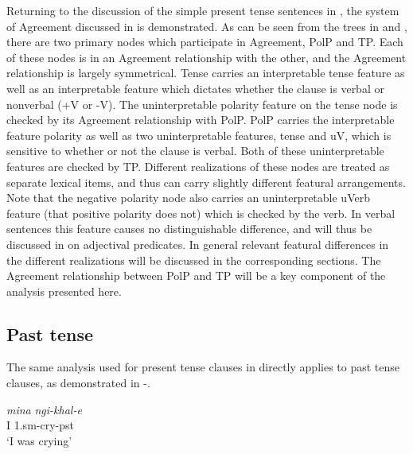 \documentclass[output=paper]{langsci/langscibook}
\begin{document}
{Returning to the discussion of the simple present tense sentences in , the system of Agreement discussed in  is demonstrated. As can be seen from the trees in  and , there are two primary nodes which participate in Agreement, PolP and TP. Each of these nodes is in an Agreement relationship with the other, and the Agreement relationship is largely symmetrical. Tense carries an interpretable tense feature as well as an interpretable feature which dictates whether the clause is verbal or nonverbal (+V or -V). The uninterpretable polarity feature on the tense node is checked by its Agreement relationship with PolP. PolP carries the interpretable feature polarity as well as two uninterpretable features, tense and uV, which is sensitive to whether or not the clause is verbal. Both of these uninterpretable features are checked by TP. Different realizations of these nodes are treated as separate lexical items, and thus can carry slightly different featural arrangements. Note that the negative polarity node also carries an uninterpretable uVerb feature (that positive polarity does not) which is checked by the verb. In verbal sentences this feature causes no distinguishable difference, and will thus be discussed in  on adjectival predicates. In general relevant featural differences in the different realizations will be discussed in the corresponding sections. The Agreement relationship between PolP and TP will be a key component of the analysis presented here.


\subsection{Past tense}

The same analysis used for present tense clauses in  directly applies to past tense clauses, as demonstrated in -.



\begin{exe}
\ex \begin{xlist}
\ex \gll \textit{mina} \textit{ngi-khal-e}\\
         I 1.{\sc sm}-cry-{\sc pst}\\
    \glt `I was crying'





\end{xlist}
\end{exe}}
\end{document}
